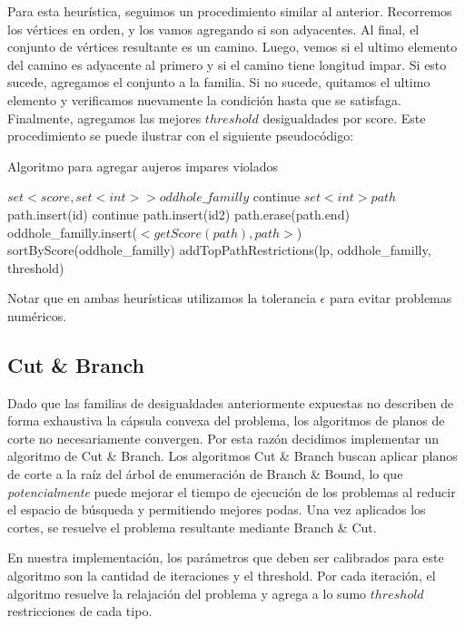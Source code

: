 Para esta heurística, seguimos un procedimiento similar al anterior. Recorremos los vértices en orden, y los vamos agregando si son adyacentes. Al final, el conjunto de vértices resultante es un camino. Luego, vemos si el ultimo elemento del camino es adyacente al primero y si el camino tiene longitud impar. Si esto sucede, agregamos el conjunto a la familia. Si no sucede, quitamos el ultimo elemento y verificamos nuevamente la condición hasta que se satisfaga. Finalmente, agregamos las mejores $threshold$ desigualdades por score. Este procedimiento se puede ilustrar con el siguiente pseudocódigo:

\begin{algorithm}
\caption{Algoritmo para agregar aujeros impares violados}
\begin{algorithmic}[1]
\State $set<score, set<int>> oddhole\_familly$
		\State continue
	\EndIf
	\State $set<int> path$
	\State path.insert(id)
			\State continue
		\EndIf
			\State path.insert(id2)
		\EndIf
	\EndFor
		\State path.erase(path.end)
	\EndWhile
		\State oddhole\_familly.insert($<getScore(path), path>$)
	\EndIf
\EndFor
\State sortByScore(oddhole\_familly)
\State addTopPathRestrictions(lp, oddhole\_familly, threshold)

\EndProcedure
\end{algorithmic}
\end{algorithm}

Notar que en ambas heurísticas utilizamos la tolerancia $\epsilon$ para evitar problemas numéricos.

\subsection{Cut \& Branch}

Dado que las familias de desigualdades anteriormente expuestas no describen de forma exhaustiva la cápsula convexa del problema, los algoritmos de planos de corte no necesariamente convergen. Por esta razón decidimos implementar un algoritmo de Cut \& Branch. Los algoritmos Cut \& Branch buscan aplicar planos de corte a la raíz del árbol de enumeración de Branch \& Bound, lo que \textit{potencialmente} puede mejorar el tiempo de ejecución de los problemas al reducir el espacio de búsqueda y permitiendo mejores podas. Una vez aplicados los cortes, se resuelve el problema resultante mediante Branch \& Cut.

En nuestra implementación, los parámetros que deben ser calibrados para este algoritmo son la cantidad de iteraciones y el threshold. Por cada iteración, el algoritmo resuelve la relajación del problema y agrega a lo sumo $threshold$ restricciones de cada tipo.